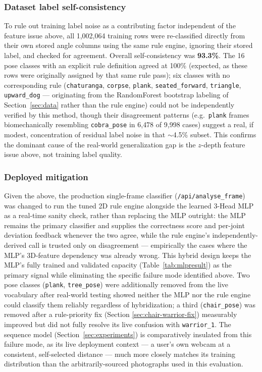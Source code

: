 \documentclass[conference]{IEEEtran}
\begin{document}
\subsubsection{Dataset label self-consistency}
To rule out training label noise as a contributing factor independent of the feature
issue above, all 1{,}002{,}064 training rows were re-classified directly from their
own stored angle columns using the same rule engine, ignoring their stored label, and
checked for agreement. Overall self-consistency was \textbf{93.3\%}. The 16 pose
classes with an explicit rule definition agreed at 100\% (expected, as these rows were
originally assigned by that same rule pass); six classes with no corresponding rule
(\texttt{chaturanga}, \texttt{corpse}, \texttt{plank}, \texttt{seated\_forward},
\texttt{triangle}, \texttt{upward\_dog} --- originating from the RandomForest bootstrap
labeling of Section~\ref{sec:data} rather than the rule engine) could not be
independently verified by this method, though their disagreement patterns (e.g.\
\texttt{plank} frames biomechanically resembling \texttt{cobra\_pose} in 6{,}478 of
9{,}998 cases) suggest a real, if modest, concentration of residual label noise in
that $\sim$4.5\% subset. This confirms the dominant cause of the real-world
generalization gap is the $z$-depth feature issue above, not training label quality.

\subsubsection{Deployed mitigation}
Given the above, the production single-frame classifier (\texttt{/api/analyse\_frame})
was changed to run the tuned 2D rule engine alongside the learned 3-Head MLP as a
real-time sanity check, rather than replacing the MLP outright: the MLP remains
the primary classifier and supplies the correctness score and per-joint deviation
feedback whenever the two agree, while the rule engine's independently-derived
call is trusted only on disagreement --- empirically the cases where the MLP's
3D-feature dependency was already wrong. This hybrid design keeps the MLP's fully
trained and validated capacity (Table~\ref{tab:mlpresult}) as the primary signal
while eliminating the specific failure mode identified above. Two pose classes
(\texttt{plank}, \texttt{tree\_pose}) were additionally removed from the live
vocabulary after real-world testing showed neither the MLP nor the rule engine
could classify them reliably regardless of hybridization; a third
(\texttt{chair\_pose}) was removed after a rule-priority fix (Section
\ref{sec:chair-warrior-fix}) measurably improved but did not fully resolve its
live confusion with \texttt{warrior\_1}. The sequence model
(Section~\ref{sec:experiments}) is comparatively insulated from this failure mode, as
its live deployment context --- a user's own webcam at a consistent, self-selected
distance --- much more closely matches its training distribution than the arbitrarily-sourced
photographs used in this evaluation.
\end{document}
